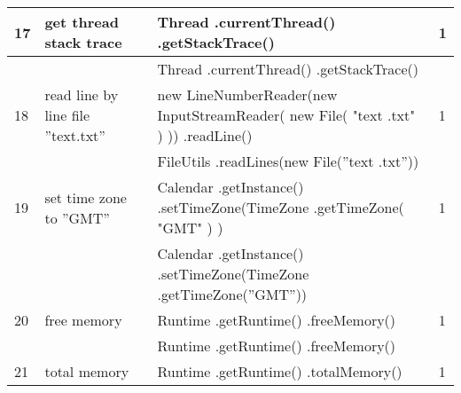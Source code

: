 \begin{longtable}{|p{}|p{}|p{}|p{}|}
		\rowcolor[HTML]{FFCCC9} 
		17                                & get thread stack trace                                 & Thread .currentThread() .getStackTrace()                                                                         & 1                                       \\ \hline
		\rowcolor[HTML]{9AFF99} 
		&                                                        & Thread .currentThread() .getStackTrace()                                                                         &                                         \\ \hline
		\rowcolor[HTML]{FFCCC9} 
		18                                & read line by line file ”text.txt”                      & new LineNumberReader(new InputStreamReader( new File( "text .txt" ) )) .readLine()                               & 1                                       \\ \hline
		\rowcolor[HTML]{9AFF99} 
		&                                                        & FileUtils .readLines(new File(”text .txt”))                                                                      &                                         \\ \hline
		\rowcolor[HTML]{FFCCC9} 
		19                                & set time zone to ”GMT”                                 & Calendar .getInstance() .setTimeZone(TimeZone .getTimeZone( "GMT" ) )                                            & 1                                       \\ \hline
		\rowcolor[HTML]{9AFF99} 
		&                                                        & Calendar .getInstance() .setTimeZone(TimeZone .getTimeZone(”GMT”))                                               &                                         \\ \hline
		\rowcolor[HTML]{FFCCC9} 
		20                                & free memory                                            & Runtime .getRuntime() .freeMemory()                                                                              & 1                                       \\ \hline
		\rowcolor[HTML]{9AFF99} 
		&                                                        & Runtime .getRuntime() .freeMemory()                                                                              &                                         \\ \hline
		\rowcolor[HTML]{FFCCC9} 
		21                                & total memory                                           & Runtime .getRuntime() .totalMemory()                                                                             & 1                                       \\ \hline

\end{longtable}
